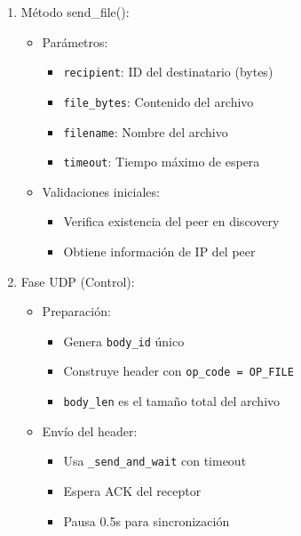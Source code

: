 \documentclass[12pt]{article}
\begin{document}
\begin{enumerate}
    \item Método send\_file():
    \begin{itemize}
        \item Parámetros:
        \begin{itemize}
            \item \texttt{recipient}: ID del destinatario (bytes)
            \item \texttt{file\_bytes}: Contenido del archivo
            \item \texttt{filename}: Nombre del archivo
            \item \texttt{timeout}: Tiempo máximo de espera
        \end{itemize}
        \item Validaciones iniciales:
        \begin{itemize}
            \item Verifica existencia del peer en discovery
            \item Obtiene información de IP del peer
        \end{itemize}
    \end{itemize}

    \item Fase UDP (Control):
    \begin{itemize}
        \item Preparación:
        \begin{itemize}
            \item Genera \texttt{body\_id} único
            \item Construye header con \texttt{op\_code = OP\_FILE}
            \item \texttt{body\_len} es el tamaño total del archivo
        \end{itemize}
        \item Envío del header:
        \begin{itemize}
            \item Usa \texttt{\_send\_and\_wait} con timeout
            \item Espera ACK del receptor
            \item Pausa 0.5s para sincronización
        \end{itemize}
    \end{itemize}


\end{enumerate}
\end{document}
